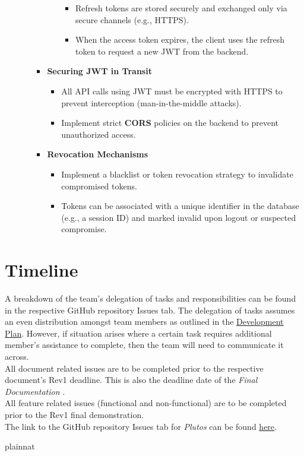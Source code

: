 \documentclass[12pt, titlepage]{article}
\begin{document}
\begin{enumerate}
\begin{itemize}
\begin{itemize}
\begin{itemize}
\begin{itemize}
					\item Refresh tokens are stored securely and exchanged only via secure channels (e.g., HTTPS).
					\item When the access token expires, the client uses the refresh token to request a new JWT from the backend.
				\end{itemize}
			\end{itemize}
			\item \textbf{Securing JWT in Transit}
			\begin{itemize}
				\item All API calls using JWT must be encrypted with HTTPS to prevent interception (man-in-the-middle attacks).
				\item Implement strict \textbf{CORS} policies on the backend to prevent unauthorized access.
			\end{itemize}
			\item \textbf{Revocation Mechanisms}
			\begin{itemize}
				\item Implement a blacklist or token revocation strategy to invalidate compromised tokens.
				\item Tokens can be associated with a unique identifier in the database (e.g., a session ID) and marked invalid upon logout or suspected compromise.
			\end{itemize}
		\end{itemize}
	\end{itemize}
\end{enumerate}

\section{Timeline}

A breakdown of the team's delegation of tasks and responsibilities can be found in the respective GitHub repository Issues tab. The
delegation of tasks assumes an even distribution amongst team members as outlined in the \href{https://github.com/PlutosCapstone/Plutos/blob/main/docs/DevelopmentPlan/DevelopmentPlan.pdf}{Development Plan}. However, if situation arises
where a certain task requires additional member's assistance to complete, then the team will need to communicate it across. \\

\noindent All document related issues are to be completed prior to the respective document's Rev1 deadline. This is also the deadline date of the \textit{Final Documentation} . \\

\noindent All feature related issues (functional and non-functional) are to be completed prior to the Rev1 final demonstration. \\

\noindent The link to the GitHub repository Issues tab for \textit{Plutos} can be found \href{https://github.com/PlutosCapstone/Plutos/issues}{here}.

 {plainnat}


\newpage{}
\end{document}
